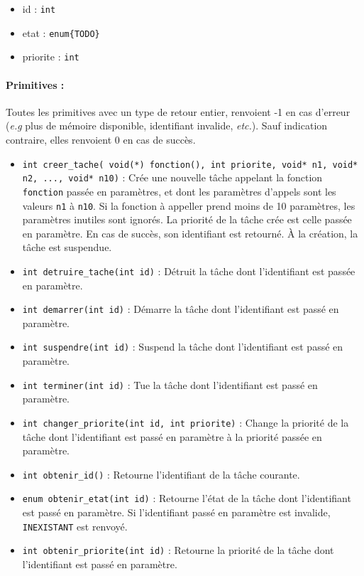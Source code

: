 {
	
}
{
\begin{itemize}
	\item id : \texttt{int}
	\item etat : \texttt{enum\{TODO\}} 
	\item priorite : \texttt{int} 
\end{itemize}
}
{
\paragraph{Primitives :}
Toutes les primitives avec un type de retour entier, renvoient -1 en cas d'erreur (\textsl{e.g} plus de mémoire disponible, identifiant invalide, \textsl{etc.}). Sauf indication contraire, elles renvoient 0 en cas de succès.

\begin{itemize}
	\item \texttt{int creer\_tache( void(*) fonction(), int priorite, void* n1, void* n2, ..., void* n10)} : Crée une nouvelle tâche appelant la fonction \texttt{fonction} passée en paramètres, et dont les paramètres d'appels sont les valeurs \texttt{n1} à \texttt{n10}. Si la fonction à appeller prend moins de 10 paramètres, les paramètres inutiles sont ignorés. La priorité de la tâche crée est celle passée en paramètre. En cas de succès, son identifiant est retourné. À la création, la tâche est suspendue.
	\item \texttt{int detruire\_tache(int id)} : Détruit la tâche dont l'identifiant est passée en paramètre. 
	
	\item \texttt{int demarrer(int id)} : Démarre la tâche dont l'identifiant est passé en paramètre.
	\item \texttt{int suspendre(int id)} : Suspend la tâche dont l'identifiant est passé en paramètre. 
	\item \texttt{int terminer(int id)} : Tue la tâche dont l'identifiant est passé en paramètre.
	
	\item \texttt{int changer\_priorite(int id, int priorite)} : Change la priorité de la tâche dont l'identifiant est passé en paramètre à la priorité passée en paramètre.

	\item \texttt{int obtenir\_id()} : Retourne l'identifiant de la tâche courante.
	\item \texttt{enum obtenir\_etat(int id)} : Retourne l'état de la tâche dont l'identifiant est passé en paramètre. Si l'identifiant passé en paramètre est invalide, \texttt{INEXISTANT} est renvoyé.
	\item \texttt{int obtenir\_priorite(int id)} : Retourne la priorité de la tâche dont l'identifiant est passé en paramètre.
\end{itemize}
}
